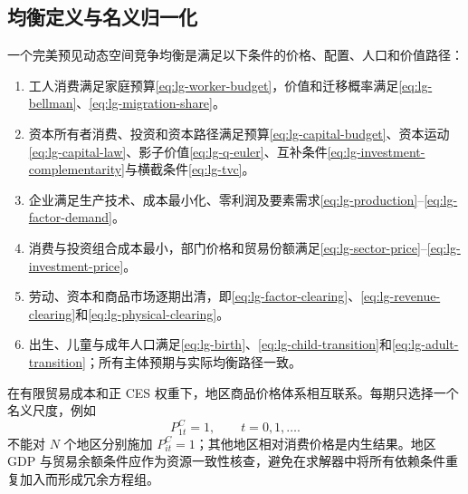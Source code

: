 \documentclass[UTF8,a4paper,zihao=-4,fontset=windows]{ctexart}
\numberwithin{equation}{section}
\newcommand{\pc}{P^{C}}
\begin{document}
\subsection{均衡定义与名义归一化}
一个完美预见动态空间竞争均衡是满足以下条件的价格、配置、人口和价值路径：
\begin{enumerate}
 \item 工人消费满足家庭预算\eqref{eq:lg-worker-budget}，价值和迁移概率满足\eqref{eq:lg-bellman}、\eqref{eq:lg-migration-share}。
 \item 资本所有者消费、投资和资本路径满足预算\eqref{eq:lg-capital-budget}、资本运动\eqref{eq:lg-capital-law}、影子价值\eqref{eq:lg-q-euler}、互补条件\eqref{eq:lg-investment-complementarity}与横截条件\eqref{eq:lg-tvc}。
 \item 企业满足生产技术、成本最小化、零利润及要素需求\eqref{eq:lg-production}--\eqref{eq:lg-factor-demand}。
 \item 消费与投资组合成本最小，部门价格和贸易份额满足\eqref{eq:lg-sector-price}--\eqref{eq:lg-investment-price}。
 \item 劳动、资本和商品市场逐期出清，即\eqref{eq:lg-factor-clearing}、\eqref{eq:lg-revenue-clearing}和\eqref{eq:lg-physical-clearing}。
 \item 出生、儿童与成年人口满足\eqref{eq:lg-birth}、\eqref{eq:lg-child-transition}和\eqref{eq:lg-adult-transition}；所有主体预期与实际均衡路径一致。
\end{enumerate}
在有限贸易成本和正 CES 权重下，地区商品价格体系相互联系。每期只选择一个名义尺度，例如
\begin{equation}
 \pc_{1t}=1,\qquad t=0,1,\ldots.
 \label{eq:lg-numeraire}
\end{equation}
不能对 $N$ 个地区分别施加 $\pc_{it}=1$；其他地区相对消费价格是内生结果。地区 GDP 与贸易余额条件应作为资源一致性核查，避免在求解器中将所有依赖条件重复加入而形成冗余方程组。
\end{document}
